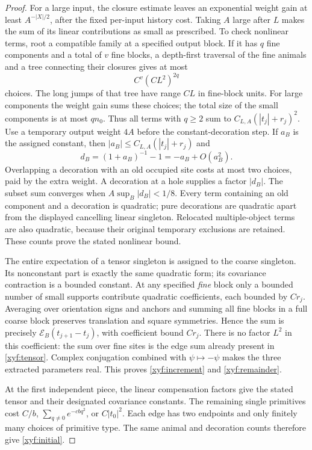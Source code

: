 \begin{proof}
For a large input, the closure estimate leaves an exponential weight
gain at least \(A^{-|X|/2}\), after the fixed per-input history cost.
Taking \(A\) large after \(L\) makes the sum of its linear contributions
as small as prescribed.  To check nonlinear terms, root a compatible
family at a specified output block.  If it has \(q\) fine components
and a total of \(v\) fine blocks, a depth-first traversal of the fine
animals and a tree connecting their closures gives at most
\[
 C^v(CL^2)^{2q}
\]
choices.  The long jumps of that tree have range \(CL\) in fine-block
units.  For large components the weight gain sums these choices; the
total size of the small components is at most \(qn_0\).  Thus all
terms with \(q\ge2\) sum to
\(C_{L,A}(|t_j|+r_j)^2\).  Use a temporary output weight \(4A\) before
the constant-decoration step.  If \(a_B\) is the assigned constant,
then \(|a_B|\le C_{L,A}(|t_j|+r_j)\) and
\[
 d_B=(1+a_B)^{-1}-1=-a_B+O(a_B^2).
\]
Overlapping a decoration with an old occupied site costs at most two
choices, paid by the extra weight.  A decoration at a hole supplies a
factor \(|d_B|\).  The subset sum converges when
\(A\sup_B|d_B|<1/8\).  Every term containing an old component and a
decoration is quadratic; pure decorations are quadratic apart from
the displayed cancelling linear singleton.  Relocated multiple-object
terms are also quadratic, because their original temporary exclusions
are retained.  These counts prove the stated nonlinear bound.

The entire expectation of a tensor singleton is assigned to the coarse
singleton.  Its nonconstant part is exactly the same quadratic form;
its covariance contraction is a bounded constant.  At any specified
\emph{fine} block only a bounded number of small supports contribute
quadratic coefficients, each bounded by \(Cr_j\).  Averaging over
orientation signs and anchors and summing all fine blocks in a full
coarse block preserves translation and square symmetries.  Hence the
sum is precisely \(\mathcal E_B(t_{j+1}-t_j)\), with coefficient
bound \(Cr_j\).  There is no factor \(L^2\) in this coefficient:
the sum over fine sites is the edge sum already present in
\eqref{xyf:tensor}.  Complex conjugation combined with
\(\psi\mapsto-\psi\) makes the three extracted parameters real.
This proves \eqref{xyf:increment} and \eqref{xyf:remainder}.

At the first independent piece, the linear compensation factors give
the stated tensor and their designated covariance constants.
The remaining single primitives cost \(C/b\),
\(\sum_{q\ne0}e^{-cbq^2}\), or \(C|t_0|^2\).  Each edge has two
endpoints and only finitely many choices of primitive type.  The same
animal and decoration counts therefore give \eqref{xyf:initial}.


\end{proof}
